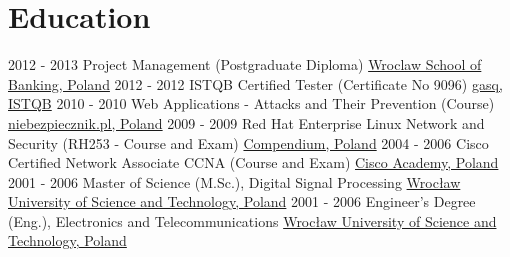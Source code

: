 \documentclass[letterpaper]{tenseconds} %
\begin{document}
\section{Education}
\begin{twenty} %
	\twentyitem
	{2012 - 2013}
	{}
	{Project Management \textnormal{(Postgraduate Diploma)}}
	{\href{https://www.wsb.pl/}{Wroclaw School of Banking, Poland}}
	{}
	{}
	\twentyitem
	{2012 - 2012}
	{}
	{ISTQB Certified Tester \textnormal{(Certificate No 9096)}}
	{\href{https://www.istqb.org/}{gasq, ISTQB}}
	{}
	{}
	\twentyitem
	{2010 - 2010}
	{}
	{Web Applications - Attacks and Their Prevention \textnormal{(Course)}}
	{\href{https://www.niebezpiecznik.pl/}{niebezpiecznik.pl, Poland}}
	{}
	{}
	\twentyitem
	{2009 - 2009}
	{}
	{Red Hat Enterprise Linux Network and Security \textnormal{(RH253 - Course and Exam)}}
	{\href{https://www.compendium.pl/}{Compendium, Poland}}
	{}
	{}
	\twentyitem
	{2004 - 2006}
	{}
	{Cisco Certified Network Associate CCNA \textnormal{(Course and Exam)}}
	{\href{https://www.cisco.com/}{Cisco Academy, Poland}}
	{}
	{}
	\twentyitem
	{2001 - 2006}
	{}
	{Master of Science (M.Sc.), Digital Signal Processing}
	{\href{https://pwr.edu.pl/}{Wrocław University of Science and Technology, Poland}}
	{}
	{}
	\twentyitem
	{2001 - 2006}
	{}
	{Engineer's Degree (Eng.), Electronics and Telecommunications}
	{\href{https://pwr.edu.pl/}{Wrocław University of Science and Technology, Poland}}
	{}
	{}
\end{twenty}
\end{document}
